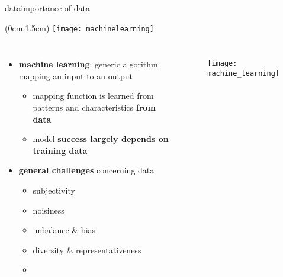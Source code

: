 \begin{frame}{data}{importance of data}
    \vspace{-5mm}
    \begin{textblock*}{100mm}(0cm,1.5cm)
        \texttt{[image: machinelearning]}
    \end{textblock*}           
    
    \begin{columns}
    \begin{itemize}
 
        \item<1->   \textbf{machine learning}: generic algorithm mapping an input to an output
            \begin{itemize}
                \item<2->   mapping function is learned from patterns and characteristics \textbf{from data}
                \item<2->[$\Rightarrow$]   model \textbf{success largely depends on training data}
                
            \end{itemize}
        \bigskip
        \item<3->   \textbf{general challenges} concerning data
            \begin{itemize}
                \item   subjectivity
                \item   noisiness
                \item   imbalance \& bias
								\item   diversity \& representativeness
                \item   {}
            \end{itemize}
    \end{itemize}
        \begin{figure}
            \texttt{[image: machine\_learning]}
        \end{figure}
    \end{columns}
\end{frame}

